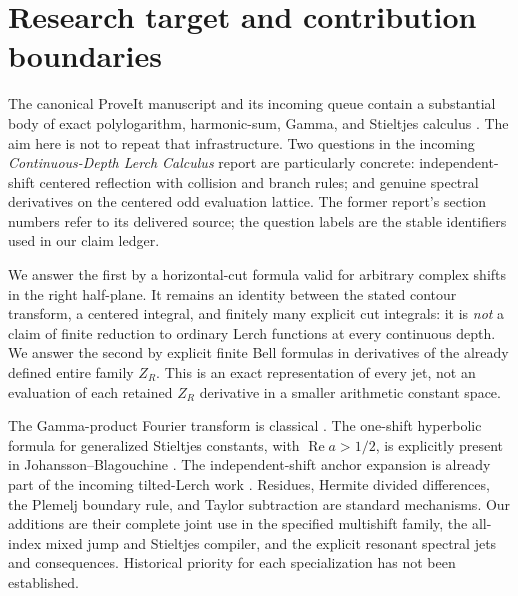 \documentclass[11pt,letterpaper]{article}
\theoremstyle{definition}\newtheorem{definition}[theorem]{Definition}
\theoremstyle{remark}\newtheorem{remark}[theorem]{Remark}
\newcommand{\Rea}{\operatorname{Re}}\newcommand{\Ima}{\operatorname{Im}}
\begin{document}
\section{Research target and contribution boundaries}
\label{mr:sec:scope}
The canonical ProveIt manuscript and its incoming queue contain a substantial
body of exact polylogarithm, harmonic-sum, Gamma, and Stieltjes calculus
\cite{Repo,CDL,Tilt}. The aim here is not to repeat that infrastructure.
Two questions in the incoming \emph{Continuous-Depth Lerch Calculus}
report \cite[Section 13, Q4 and Q8]{CDL} are particularly concrete:
independent-shift centered reflection with collision and branch rules;
and genuine spectral derivatives on the centered odd evaluation lattice.
The former report's section numbers refer to its delivered source; the
question labels are the stable identifiers used in our claim ledger.

We answer the first by a horizontal-cut formula valid for arbitrary complex
shifts in the right half-plane. It remains an identity between the stated
contour transform, a centered integral, and finitely many explicit cut
integrals: it is \emph{not} a claim of finite reduction to ordinary Lerch
functions at every continuous depth. We answer the second by explicit
finite Bell formulas in derivatives of the already defined entire family
$Z_R$. This is an exact representation of every jet, not an evaluation
of each retained $Z_R$ derivative in a smaller arithmetic constant space.

The Gamma-product Fourier transform is classical \cite{CS,Beta}.
The one-shift hyperbolic formula for generalized Stieltjes constants, with
$\Rea a>1/2$, is explicitly present in Johansson--Blagouchine
\cite[equation (2)]{JB}. The independent-shift anchor expansion is already
part of the incoming tilted-Lerch work \cite{Tilt}. Residues, Hermite
divided differences, the Plemelj boundary rule, and Taylor subtraction are
standard mechanisms. Our additions are their complete joint use in the
specified multishift family, the all-index mixed jump and Stieltjes
compiler, and the explicit resonant spectral jets and consequences.
Historical priority for each specialization has not been established.
\end{document}
